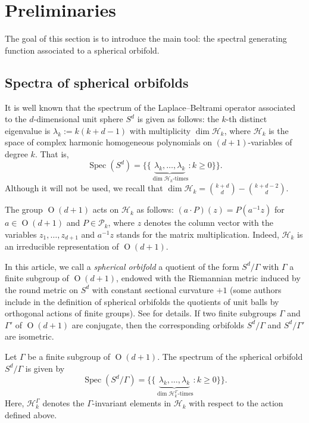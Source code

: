 \documentclass[12pt,a4paper,final]{amsart}
\theoremstyle{plain}
\theoremstyle{definition}
\theoremstyle{remark}
\numberwithin{equation}{section}
\DeclareMathOperator{\Ot}{O}
\DeclareMathOperator{\Spec}{Spec}
\begin{document}
\section{Preliminaries}\label{sec:preliminaries}

The goal of this section is to introduce the main tool: the spectral generating function associated to a spherical orbifold.  

\subsection{Spectra of spherical orbifolds}
It is well known that the spectrum of the Laplace--Beltrami operator associated to the $d$-dimensional unit sphere $S^d$ is given as follows: the $k$-th distinct eigenvalue is $\lambda_k:=k(k+d-1)$ with multiplicity $\dim \mathcal H_k$, where $\mathcal H_k$ is the space of complex harmonic homogeneous polynomials on $(d+1)$-variables of degree $k$.
That is, 
\begin{equation*}
\Spec(S^d)
= \Big\{\!\!\Big\{ 			\underbrace{\lambda_k,\dots,\lambda_k}_{ \dim \mathcal H_k\text{-times}} : k\geq0 
\Big\}\!\!\Big\}
.
\end{equation*}
Although it will not be used, we recall that
$
\dim\mathcal H_k=\binom{k+d}{d}-\binom{k+d-2}{d}.
$

The group $\Ot(d+1)$ acts on $\mathcal H_k$ as follows: $(a\cdot P)(z)=P(a^{-1}z)$ for $a\in\Ot(d+1)$ and $P\in\mathcal P_k$, where $z$ denotes the column vector with the variables $z_1,\dots,z_{d+1}$ and $a^{-1}z$ stands for the matrix multiplication. 
Indeed, $\mathcal H_k$ is an irreducible representation of $\Ot(d+1)$. 

In this article, we call a \emph{spherical orbifold} a quotient of the form $S^d/\Gamma$ with $\Gamma$ a finite subgroup of $\Ot(d+1)$, endowed with the Riemannian metric induced by the round metric on $S^d$ with constant sectional curvature $+1$ (some authors include in the definition of spherical orbifolds the quotients of unit balls by orthogonal actions of finite groups). 
See \cite{Gordon12-orbifold} for details. 
If two finite subgroups $\Gamma$ and $\Gamma'$ of $\Ot(d+1)$ are conjugate, then the corresponding orbifolds $S^d/\Gamma$ and $S^d/\Gamma'$ are isometric. 



Let $\Gamma$ be a finite subgroup of $\Ot(d+1)$. 
The spectrum of the spherical orbifold $S^{d}/\Gamma$ is given by 
\begin{equation}\label{eq:Spec(S^d/Gamma)}
\Spec(S^d/\Gamma)
= \Big\{\!\!\Big\{ 			\underbrace{\lambda_k,\dots,\lambda_k}_{ \dim \mathcal H_k^\Gamma\text{-times}} : k\geq0 
\Big\}\!\!\Big\}
.
\end{equation}
Here, $\mathcal H_k^\Gamma$ denotes the $\Gamma$-invariant elements in $\mathcal H_k$ with respect to the action defined above. 
\end{document}
